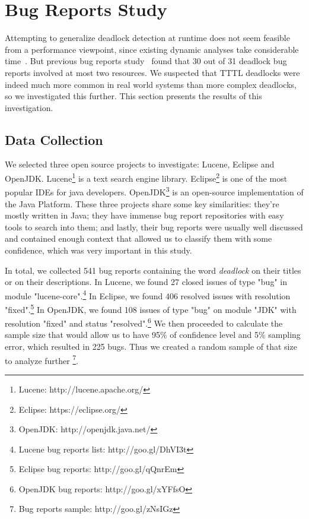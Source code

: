 \section{Bug Reports Study}\label{bugs}

Attempting to generalize deadlock detection at runtime does not seem feasible from a performance viewpoint, since existing dynamic analyses take considerable time~\cite{magicfuzzer}. But previous bug reports study~\cite{lu} found that 30 out of 31 deadlock bug reports involved at most two resources. We suspected that TTTL deadlocks were indeed much more common in real world systems than more complex deadlocks, so we investigated this further. This section presents the results of this investigation.

\subsection{Data Collection}

We selected three open source projects to investigate: Lucene, Eclipse and OpenJDK. Lucene\footnote{Lucene: http://lucene.apache.org/} is a text search engine library. Eclipse\footnote{Eclipse: https://eclipse.org/} is one of the most popular IDEs for java developers. OpenJDK\footnote{OpenJDK: http://openjdk.java.net/} is an open-source implementation of the Java Platform. These three projects share some key similarities: they're mostly written in Java; they have immense bug report repositories with easy tools to search into them; and lastly, their bug reports were usually well discussed and contained enough context that allowed us to classify them with some confidence, which was very important in this study.

In total, we collected 541 bug reports containing the word \emph{deadlock} on their titles or on their descriptions. In Lucene, we found 27 closed issues of type "bug" in module "lucene-core".\footnote{Lucene bug reports list: http://goo.gl/DhVI3t}
In Eclipse, we found 406 resolved issues with resolution "fixed".\footnote{Eclipse bug reports: http://goo.gl/qQnrEm}
In OpenJDK, we found 108 issues of type "bug" on module "JDK" with resolution "fixed" and status "resolved".\footnote{OpenJDK bug reports: http://goo.gl/xYFfsO} We then proceeded to calculate the sample size that would allow us to have 95\% of confidence level and 5\% sampling error,  which resulted in 225 bugs. Thus we created a random sample of that size to analyze further \footnote{Bug reports sample: http://goo.gl/zNsIGz}.

